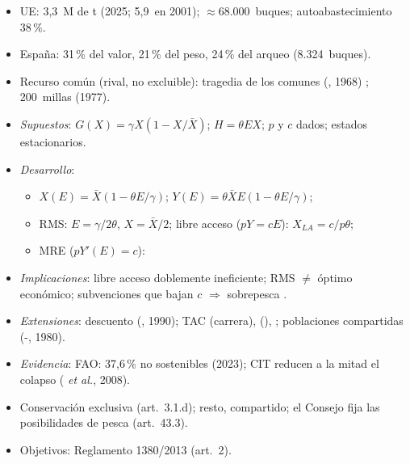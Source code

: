 \documentclass{article}
\begin{document}
\begin{columnas}
\begin{itemize}
\item UE: 3,3~M de t (2025; 5,9~en 2001); $\approx$68.000~buques; autoabastecimiento 38\,\%.
\item España: 31\,\% del valor, 21\,\% del peso, 24\,\% del arqueo (8.324~buques).
\item Recurso común (rival, no excluible): tragedia de los comunes (, 1968) ; 200~millas (1977).
\end{itemize}
\begin{itemize}
\item \emph{Supuestos}: $G(X)=\gamma X(1-X/\bar X)$; $H=\theta EX$; $p$ y $c$ dados; estados estacionarios.
\item \emph{Desarrollo}:
  \begin{itemize}
  \item $X(E)=\bar X(1-\theta E/\gamma)$; $Y(E)=\theta\bar XE(1-\theta E/\gamma)$;
  \item RMS: $E=\gamma/2\theta$, $X=\bar X/2$; libre acceso ($pY=cE$): $X_{\mathit{LA}}=c/p\theta$;
  \item MRE ($pY'(E)=c$):
  \end{itemize}
\end{itemize}
\begin{itemize}
\item \emph{Implicaciones}: libre acceso doblemente ineficiente; RMS $\neq$ óptimo económico; subvenciones que bajan $c$ $\Rightarrow$ sobrepesca .
\item \emph{Extensiones}: descuento (, 1990); TAC (carrera),  (), ; poblaciones compartidas (-, 1980).
\item \emph{Evidencia}: FAO: 37,6\,\% no sostenibles (2023); CIT reducen a la mitad el colapso ( \emph{et al.}, 2008).
\end{itemize}
\begin{itemize}
\item Conservación exclusiva (art.~3.1.d); resto, compartido; el Consejo fija las posibilidades de pesca (art.~43.3).
\item Objetivos: Reglamento 1380/2013 (art.~2).
\end{itemize}


\end{columnas}
\end{document}
